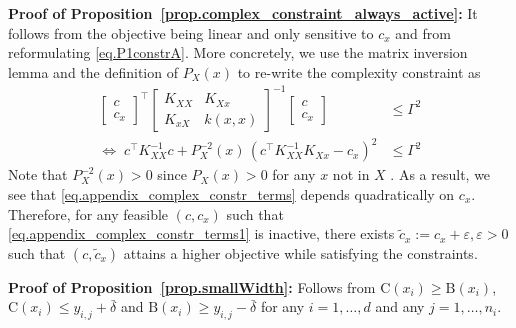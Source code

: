 \begin{my_proof}
	\textbf{Proof of Proposition~\ref{prop.complex_constraint_always_active}:}
	It follows from the objective being linear and only sensitive to $c_x$ and from reformulating \eqref{eq.P1constrA}. More concretely, we use the matrix inversion lemma and the definition of $P_X(x)$ to re-write the complexity constraint as
	\begin{subequations}
		\begin{align}
			\begin{bmatrix}
				c \\
				c_x
			\end{bmatrix}^\top 
			\begin{bmatrix}
				K_{XX} & K_{Xx} \\
				K_{xX } & k(x,x)
			\end{bmatrix}^{-1} 
			\begin{bmatrix}
				c \\
				c_x
			\end{bmatrix} & \leq \Gamma^2 
		   \label{eq.appendix_complex_constr_terms1}
		   \\
			\Leftrightarrow \;
			c^\top K^{-1}_{XX} c
			+
			P_{X}^{-2}(x) \, \left( c^\top K_{XX}^{-1} K_{Xx} - c_x \right)^2 
			&\leq \Gamma^2 
			\label{eq.appendix_complex_constr_terms}
		\end{align}
	\end{subequations}
	Note that $P_X^{-2}(x) > 0$ since $P_X(x) > 0$ for any $x$ not in $X$ \citep{karvonen2022error}. As a result, we see that \eqref{eq.appendix_complex_constr_terms} depends quadratically on $c_x$. Therefore, for any feasible $(c, c_x)$ such that \eqref{eq.appendix_complex_constr_terms1} is inactive, there exists $ \tilde c_x := c_x + \varepsilon, \varepsilon > 0$ such that $(c,\tilde c_x)$ attains a higher objective while satisfying the constraints.
\end{my_proof}

\begin{my_proof}
	\textbf{Proof of Proposition~\ref{prop.smallWidth}:}
	Follows from $\text{C}(x_i) \geq \text{B}(x_i)$, $\text{C}(x_i) \leq y_{i,j} + \bar \delta$ and $\text{B}(x_i) \geq y_{i,j} - \bar \delta$ for any $i=1,\dots,d$ and any $j=1,\dots,n_i$. 
\end{my_proof} 

